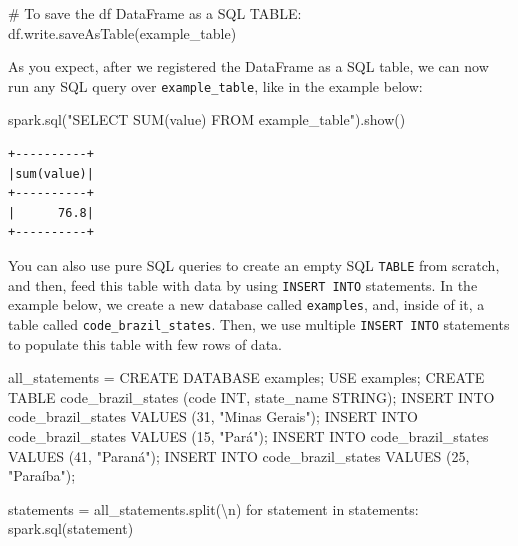 \documentclass[
  11pt,
  letterpaper,
  DIV=11,
  numbers=noendperiod]{scrreprt}
\newenvironment{Shaded}{\begin{snugshade}}{\end{snugshade}}
\newcommand{\CharTok}[1]{\textcolor[rgb]{0.13,0.47,0.30}{#1}}
\newcommand{\CommentTok}[1]{\textcolor[rgb]{0.37,0.37,0.37}{#1}}
\newcommand{\ControlFlowTok}[1]{\textcolor[rgb]{0.00,0.23,0.31}{#1}}
\newcommand{\KeywordTok}[1]{\textcolor[rgb]{0.00,0.23,0.31}{#1}}
\newcommand{\NormalTok}[1]{\textcolor[rgb]{0.00,0.23,0.31}{#1}}
\newcommand{\OperatorTok}[1]{\textcolor[rgb]{0.37,0.37,0.37}{#1}}
\newcommand{\StringTok}[1]{\textcolor[rgb]{0.13,0.47,0.30}{#1}}
\begin{document}
\begin{Shaded}
\begin{Highlighting}[]
\CommentTok{\# To save the \textasciigrave{}df\textasciigrave{} DataFrame as a SQL TABLE:}
\NormalTok{df.write.saveAsTable(}\StringTok{\textquotesingle{}example\_table\textquotesingle{}}\NormalTok{)}
\end{Highlighting}
\end{Shaded}

As you expect, after we registered the DataFrame as a SQL table, we can
now run any SQL query over \texttt{example\_table}, like in the example
below:

\begin{Shaded}
\begin{Highlighting}[]
\NormalTok{spark.sql(}\StringTok{"SELECT SUM(value) FROM example\_table"}\NormalTok{).show()}
\end{Highlighting}
\end{Shaded}

\begin{verbatim}
+----------+
|sum(value)|
+----------+
|      76.8|
+----------+
\end{verbatim}

You can also use pure SQL queries to create an empty SQL \texttt{TABLE}
from scratch, and then, feed this table with data by using
\texttt{INSERT\ INTO} statements. In the example below, we create a new
database called \texttt{examples}, and, inside of it, a table called
\texttt{code\_brazil\_states}. Then, we use multiple
\texttt{INSERT\ INTO} statements to populate this table with few rows of
data.

\begin{Shaded}
\begin{Highlighting}[]
\NormalTok{all\_statements }\OperatorTok{=} \StringTok{\textquotesingle{}\textquotesingle{}\textquotesingle{}CREATE DATABASE \textasciigrave{}examples\textasciigrave{};}
\StringTok{USE \textasciigrave{}examples\textasciigrave{};}
\StringTok{CREATE TABLE \textasciigrave{}code\_brazil\_states\textasciigrave{} (\textasciigrave{}code\textasciigrave{} INT, \textasciigrave{}state\_name\textasciigrave{} STRING);}
\StringTok{INSERT INTO \textasciigrave{}code\_brazil\_states\textasciigrave{} VALUES (31, "Minas Gerais");}
\StringTok{INSERT INTO \textasciigrave{}code\_brazil\_states\textasciigrave{} VALUES (15, "Pará");}
\StringTok{INSERT INTO \textasciigrave{}code\_brazil\_states\textasciigrave{} VALUES (41, "Paraná");}
\StringTok{INSERT INTO \textasciigrave{}code\_brazil\_states\textasciigrave{} VALUES (25, "Paraíba");\textquotesingle{}\textquotesingle{}\textquotesingle{}}

\NormalTok{statements }\OperatorTok{=}\NormalTok{ all\_statements.split(}\StringTok{\textquotesingle{}}\CharTok{\textbackslash{}n}\StringTok{\textquotesingle{}}\NormalTok{)}
\ControlFlowTok{for}\NormalTok{ statement }\KeywordTok{in}\NormalTok{ statements:}
\NormalTok{  spark.sql(statement)}
\end{Highlighting}
\end{Shaded}
\end{document}
